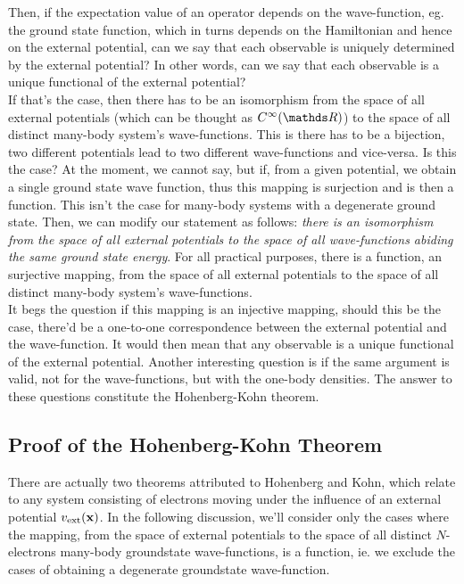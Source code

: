 \documentclass{homework}
\begin{document}
Then, if the expectation value of an operator depends on the wave-function, eg. the ground state function, which in turns depends on the Hamiltonian and hence on the external potential, can we say that each observable is uniquely determined by the external potential? In other words, can we say that each observable is a unique functional of the external potential? \\

If that's the case, then there has to be an isomorphism from the space of all external potentials (which can be thought as $C^\infty(\R)$) to the space of all distinct many-body system's wave-functions. This is there has to be a bijection, two different potentials lead to two different wave-functions and vice-versa. Is this the case? At the moment, we cannot say, but if, from a given potential, we obtain a single ground state wave function, thus this mapping is surjection and is then a function. This isn't the case for many-body systems with a degenerate ground state. Then, we can modify our statement as follows: \textit{there is an isomorphism from the space of all external potentials to the space of all wave-functions abiding the same ground state energy}. For all practical purposes, there is a function, an surjective mapping, from the space of all external potentials to the space of all distinct many-body system's wave-functions. \\

It begs the question if this mapping is an injective mapping, should this be the case, there'd be a one-to-one correspondence between the external potential and the wave-function. It would then mean that any observable is a unique functional of the external potential. Another interesting question is if the same argument is valid, not for the wave-functions, but with the one-body densities. The answer to these questions constitute the Hohenberg-Kohn theorem. \\

\subsection{Proof of the Hohenberg-Kohn Theorem}

There are actually two theorems attributed to Hohenberg and Kohn, which relate to any system consisting of electrons moving under the influence of an external potential $v_{\textnormal{ext}}({\bf x})$. In the following discussion, we'll consider only the cases where the mapping, from the space of external potentials to the space of all distinct $N$-electrons many-body groundstate wave-functions, is a function, ie. we exclude the cases of obtaining a degenerate groundstate wave-function. \\
\end{document}
